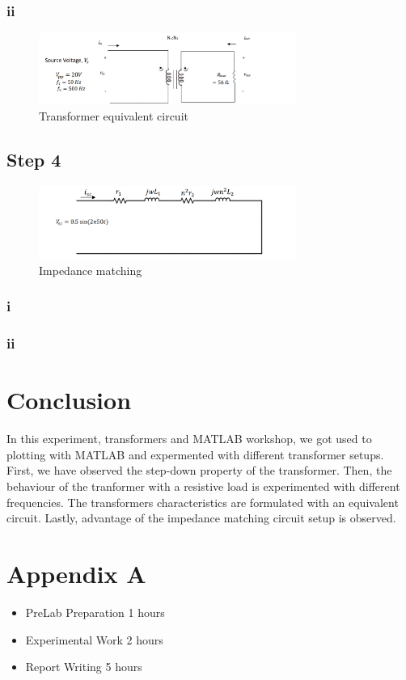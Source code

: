 \documentclass[letterpaper,12pt]{article}
\begin{document}
\subsubsection{ii}
\begin{figure}[H]
    \centering
    \includegraphics[width = 0.75\textwidth]{2.png}
    \caption{Transformer equivalent circuit}
\end{figure} 
%
\subsection{Step 4}
\begin{figure}[H]
    \centering
    \includegraphics[width = 0.75\textwidth]{3.png}
    \caption{Impedance matching}
\end{figure} 

\subsubsection{i}
\subsubsection{ii}


\section{Conclusion}
In this experiment, transformers and MATLAB workshop, we got used to plotting with MATLAB and expermented with different transformer setups. First, we have observed the step-down property of the transformer. Then, the behaviour of the tranformer with a resistive load is experimented with different frequencies. The transformers characteristics are formulated with an equivalent circuit. Lastly, advantage of the impedance matching circuit setup is observed.
\section*{Appendix A}
\begin{itemize}
    \item PreLab Preparation 1 hours
    \item Experimental Work 2  hours
    \item Report Writing 5 hours
\end{itemize}
\end{document}
